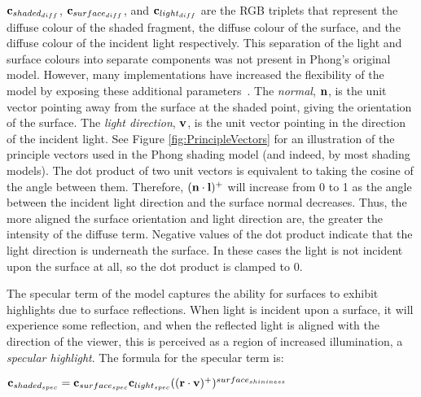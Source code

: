 \begin{math}\mathbf{c}_{shaded_{diff}}\end{math}, \begin{math}\mathbf{c}_{surface_{diff}}\end{math}, and \begin{math}\mathbf{c}_{light_{diff}}\end{math} are the RGB triplets that represent the diffuse colour of the shaded fragment, the diffuse colour of the surface, and the diffuse colour of the incident light respectively. This separation of the light and surface colours into separate components was not present in Phong's original model. However, many implementations have increased the flexibility of the model by exposing these additional parameters~\cite{LightingModelForComputerAnimators}. The \textit{normal}, \begin{math}\mathbf{n}\end{math}, is the unit vector pointing away from the surface at the shaded point, giving the orientation of the surface.  The \textit{light direction}, \begin{math}\mathbf{v}\end{math}, is the unit vector pointing in the direction of the incident light. See Figure \ref{fig:PrincipleVectors} for an illustration of the principle vectors used in the Phong shading model (and indeed, by most shading models). The dot product of two unit vectors is equivalent to taking the cosine of the angle between them. Therefore, \begin{math}(\mathbf{n}\cdot\mathbf{l})^+\end{math} will increase from 0 to 1 as the angle between the incident light direction and the surface normal decreases. Thus, the more aligned the surface orientation and light direction are, the greater the intensity of the diffuse term. Negative values of the dot product indicate that the light direction is underneath the surface. In these cases the light is not incident upon the surface at all, so the dot product is clamped to 0.

The specular term of the model captures the ability for surfaces to exhibit highlights due to surface reflections. When light is incident upon a surface, it will experience some reflection, and when the reflected light is aligned with the direction of the viewer, this is perceived as a region of increased illumination, a \textit{specular highlight}. The formula for the specular term is:

\begin{center}
	\begin{math}\mathbf{c}_{shaded_{spec}} = \mathbf{c}_{surface_{spec}}\mathbf{c}_{light_{spec}}((\mathbf{r}\cdot\mathbf{v})^+)^{surface_{shininess}}\end{math} \\
\end{center}

